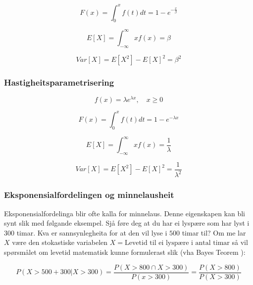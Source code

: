 \begin{equation}
    F(x) = \int_{0}^x f(t) dt = 1 - e^{-\frac{x}{\beta}}
\end{equation}

\begin{equation}
    E[X] = \int_{-\infty}^{\infty} xf(x) = \beta
\end{equation}

\begin{equation}
    Var[X] = E[X^2] - E[X]^2 = \beta^2
\end{equation}

\subsubsection{Hastigheitsparametrisering}

\begin{equation}
    f(x) = \lambda e^{\lambda x},  \quad  x \geq 0
\end{equation}

\begin{equation}
    F(x) = \int_{0}^x f(t) dt = 1 - e^{- \lambda x}
\end{equation}

\begin{equation}
    E[X] = \int_{-\infty}^{\infty} xf(x) = \frac{1}{\lambda}
\end{equation}

\begin{equation}
    Var[X] = E[X^2] - E[X]^2 = \frac{1}{\lambda^2}
\end{equation}

\subsubsection{Eksponensialfordelingen og minnelausheit} \label{memless}
Eksponensialfordelinga blir ofte kalla for minnelaus. \cite{wiki:memless} Denne eigenskapen kan bli synt slik med følgande eksempel. Sjå føre deg at du har ei lyspære som har lyst i $300$ timar. Kva er sannsynlegheita for at den vil lyse i $500$ timar til? Om me lar $X$ være den stokastiske variabelen $X = \text{Levetid til ei lyspære i antal timar}$ så vil spørsmålet om levetid matematisk kunne formulerast slik (vha Bayes Teorem \cite{wiki:bayes}):

\begin{equation}
    P(X > 500 + 300 | X > 300) = \frac{P(X > 800 \cap X > 300)}{P(x > 300)} = \frac{P(X > 800)}{P(X > 300)} 
\end{equation}

